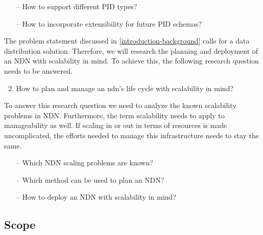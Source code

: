 
\begin{itemize}
    \item[--] How to support different PID types?
    \item[--] How to incorporate extensibility for future PID schemas?
\end{itemize}

The problem statement discussed in \ref{introduction-background} calls for a data distribution solution. Therefore, we will research the planning and deployment of an NDN with scalability in mind. To achieve this, the following research question needs to be answered.
\begin{enumerate}
\setcounter{enumi}{1}
    \item How to plan and manage an \gls{ndn}'s life cycle with scalability in mind?
\end{enumerate}

To answer this research question we need to analyze the known scalability problems in NDN. Furthermore, the term scalability needs to apply to manageability as well. If scaling in or out in terms of resources is made uncomplicated, the efforts needed to manage this infrastructure needs to stay the same.
\begin{itemize}
    \item[--] Which NDN scaling problems are known?
    \item[--] Which method can be used to plan an NDN?
    \item[--] How to deploy an NDN with scalability in mind?
\end{itemize}

\subsection{Scope}
\label{introduction-scope}

